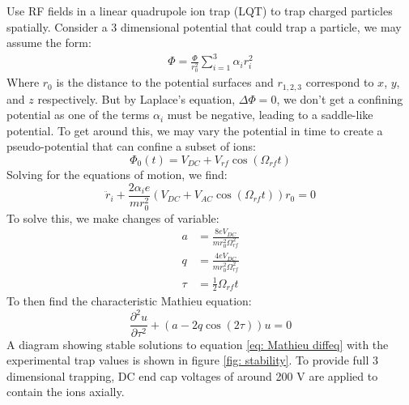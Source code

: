 Use RF fields in a linear quadrupole ion trap (LQT) to trap charged particles spatially.\cite{Wolfgang1990} Consider a 3 dimensional potential that could trap a particle, we may assume the form:
\begin{align*}
	\Phi = \frac{\Phi}{r_0^2} \sum_{i=1}^3 \alpha_i r_i^2
\end{align*}
Where $r_0$ is the distance to the potential surfaces and $r_{1,2,3}$ correspond to $x$, $y$, and $z$ respectively. But by Laplace's equation, $\Delta \Phi = 0$, we don't get a confining potential as one of the terms $\alpha_i$ must be negative, leading to a saddle-like potential. To get around this, we may vary the potential in time to create a pseudo-potential that can confine a subset of ions:
\begin{equation*}
	\Phi_0(t) = V_{DC} + V_{rf} \cos(\Omega_{rf} t)
\end{equation*}
Solving for the equations of motion, we find:
\begin{equation}
	\ddot{r}_i + \frac{2 \alpha_i e}{m r_0^2}(V_{DC} + V_{AC} \cos(\Omega_{rf} t))r_0 = 0
\end{equation}
To solve this, we make changes of variable:
\begin{align}
	a & = \frac{8eV_{DC}}{mr_0^2\Omega_{rf}^2} \label{eq: a param} \\
	q & = \frac{4eV_{DC}}{mr_0^2\Omega_{rf}^2} \label{eq: q param} \\
	\tau & = \frac{1}{2}\Omega_{rf} t \nonumber
\end{align}
To then find the characteristic Mathieu equation:
\begin{equation}
	\frac{\partial^2 u}{\partial \tau^2} + (a - 2q \cos(2 \tau))u = 0
	\label{eq: Mathieu diffeq}
\end{equation}
A diagram showing stable solutions to equation \ref{eq: Mathieu diffeq} with the experimental trap values is shown in figure \ref{fig: stability}. To provide full 3 dimensional trapping, DC end cap voltages of around 200 V are applied to contain the ions axially.

